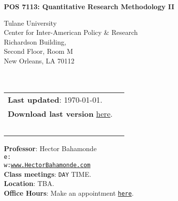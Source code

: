 \documentclass[letterpaper]{article}
\def\name{POS 7113: Quantitative Research Methodology II}
\begin{document}

\centerline{\huge \bf \name}

\vspace{0.25in}

\begin{minipage}{0.45\linewidth}
  Tulane University \\
  Center for Inter-American Policy \& Research \\
  Richardson Building, \\
  Second Floor, Room M \\
  New Orleans, LA 70112\\
  \\
  \\

\end{minipage}
\hspace{4cm}\begin{minipage}{0.45\linewidth}
  \begin{tabular}{ll}
{\bf Last updated}: \today. \\
 {\bf Download last version} \href{https://github.com/hbahamonde/Quantitative_Methods_2_GRAD/raw/master/Bahamonde_Quantitative_Methods_2_GRAD.pdf}{here}.\\
  {\bf {\color{red}{\scriptsize Not intended as a definitive version}}} %
    \\
    \\
    \\
    \\
    \\
  \end{tabular}
\end{minipage}

\vspace{-5mm}
{\bf Professor}: Hector Bahamonde\\
\texttt{e:}\href{mailto:\filetext}{\texttt{\filetext}}\\
\texttt{w:}\href{http://www.hectorbahamonde.com}{\texttt{www.HectorBahamonde.com}}\\
{\bf Class meetings}: \texttt{DAY} TIME.\\
{\bf Location}: TBA.\\
{\bf Office Hours}: Make an appointment \href{https://calendly.com/bahamonde/officehours}{\texttt{here}}.%
\end{document}
